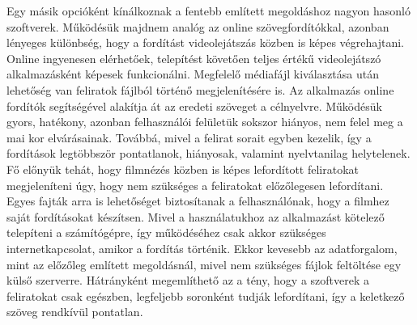 Egy másik opcióként kínálkoznak a fentebb említett megoldáshoz nagyon hasonló szoftverek. Működésük majdnem analóg az online szövegfordítókkal, azonban lényeges különbség, hogy a fordítást videolejátszás közben is képes végrehajtani. Online ingyenesen elérhetőek, telepítést követően teljes értékű videolejátszó alkalmazásként képesek funkcionálni. Megfelelő médiafájl kiválasztása után lehetőség van feliratok fájlból történő megjelenítésére is. Az alkalmazás online fordítók segítségével alakítja át az eredeti szöveget a célnyelvre. Működésük gyors, hatékony, azonban felhasználói felületük sokszor hiányos, nem felel meg a mai kor elvárásainak. Továbbá, mivel a felirat sorait egyben kezelik, így a fordítások legtöbbször pontatlanok, hiányosak, valamint nyelvtanilag helytelenek. Fő előnyük tehát, hogy filmnézés közben is képes lefordított feliratokat megjeleníteni úgy, hogy nem szükséges a feliratokat előzőlegesen lefordítani. Egyes fajták arra is lehetőséget biztosítanak a felhasználónak, hogy a filmhez saját fordításokat készítsen. Mivel a használatukhoz az alkalmazást kötelező telepíteni a számítógépre, így működéséhez csak akkor szükséges internetkapcsolat, amikor a fordítás történik. Ekkor kevesebb az adatforgalom, mint az előzőleg említett megoldásnál, mivel nem szükséges fájlok feltöltése egy külső szerverre. Hátrányként megemlíthető az a tény, hogy a szoftverek a feliratokat csak egészben, legfeljebb soronként tudják lefordítani, így a keletkező szöveg rendkívül pontatlan.
